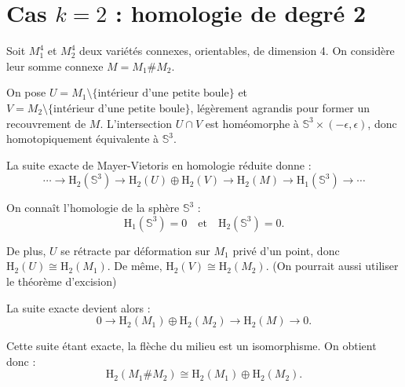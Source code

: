 \documentclass[12pt]{article}
\newcommand{\Hom}{\mathrm{H}}
\begin{document}
\section*{Cas \(k = 2\) : homologie de degr\'e 2}

Soit \(M_1^4\) et \(M_2^4\) deux vari\'et\'es connexes, orientables, de dimension 4. On consid\`ere leur somme connexe \(M = M_1 \# M_2\).

On pose \(U = M_1 \setminus \{\text{int\'erieur d'une petite boule}\}\) et \(V = M_2 \setminus \{\text{int\'erieur d'une petite boule}\}\), l\'eg\`erement agrandis pour former un recouvrement de \(M\). L'intersection \(U \cap V\) est hom\'eomorphe \`a \(\mathbb{S}^3 \times (-\epsilon, \epsilon)\), donc homotopiquement \'equivalente \`a \(\mathbb{S}^3\).

La suite exacte de Mayer-Vietoris en homologie r\'eduite donne :
\[
\cdots \to \Hom_2(\mathbb{S}^3) \to \Hom_2(U) \oplus \Hom_2(V) \to \Hom_2(M) \to \Hom_1(\mathbb{S}^3) \to \cdots
\]

On conna\^it l'homologie de la sph\`ere \(\mathbb{S}^3\) :
\[
\Hom_1(\mathbb{S}^3) = 0 \quad \text{et} \quad \Hom_2(\mathbb{S}^3) = 0.
\]

De plus, \(U\) se r\'etracte par d\'eformation sur \(M_1\) priv\'e d'un point, donc \(\Hom_2(U) \cong \Hom_2(M_1)\). De m\^eme, \(\Hom_2(V) \cong \Hom_2(M_2)\). (On pourrait aussi utiliser le théorème d'excision)

La suite exacte devient alors :
\[
0 \to \Hom_2(M_1) \oplus \Hom_2(M_2) \to \Hom_2(M) \to 0.
\]

Cette suite \'etant exacte, la fl\`eche du milieu est un isomorphisme. On obtient donc :
\[
\boxed{\Hom_2(M_1 \# M_2) \cong \Hom_2(M_1) \oplus \Hom_2(M_2)}.
\]
\end{document}

